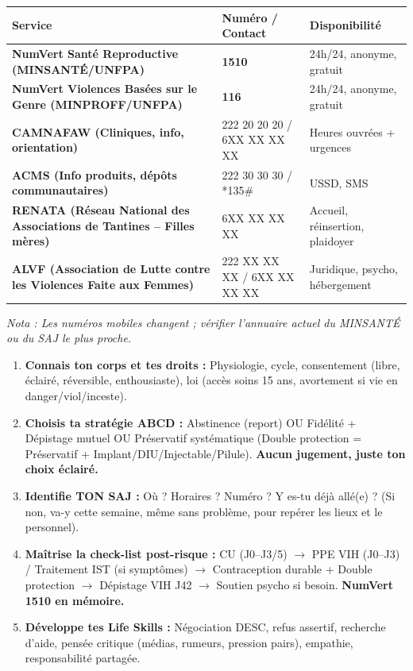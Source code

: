 \documentclass[11pt]{article}
\begin{document}
\begin{savaistu}
\begin{center}
\begin{tabularx}{\linewidth}{|l|X|l|}\hline
\textbf{Service} & \textbf{Numéro / Contact} & \textbf{Disponibilité} \\ \hline
\textbf{NumVert Santé Reproductive (MINSANTÉ/UNFPA)} & \textbf{1510} & 24h/24, anonyme, gratuit \\ \hline
\textbf{NumVert Violences Basées sur le Genre (MINPROFF/UNFPA)} & \textbf{116} & 24h/24, anonyme, gratuit \\ \hline
\textbf{CAMNAFAW (Cliniques, info, orientation)} & 222 20 20 20 / 6XX XX XX XX & Heures ouvrées + urgences \\ \hline
\textbf{ACMS (Info produits, dépôts communautaires)} & 222 30 30 30 / *135\# & USSD, SMS \\ \hline
\textbf{RENATA (Réseau National des Associations de Tantines -- Filles mères)} & 6XX XX XX XX & Accueil, réinsertion, plaidoyer \\ \hline
\textbf{ALVF (Association de Lutte contre les Violences Faite aux Femmes)} & 222 XX XX XX / 6XX XX XX XX & Juridique, psycho, hébergement \\ \hline
\end{tabularx}
\end{center}
\emph{Nota : Les numéros mobiles changent ; vérifier l'annuaire actuel du MINSANTÉ ou du SAJ le plus proche.}
\end{savaistu}

\begin{aretenir}
\begin{enumerate}
    \item \textbf{Connais ton corps et tes droits :} Physiologie, cycle, consentement (libre, éclairé, réversible, enthousiaste), loi (accès soins 15 ans, avortement si vie en danger/viol/inceste).
    \item \textbf{Choisis ta stratégie ABCD :} Abstinence (report) OU Fidélité + Dépistage mutuel OU Préservatif systématique (Double protection = Préservatif + Implant/DIU/Injectable/Pilule). \textbf{Aucun jugement, juste ton choix éclairé.}
    \item \textbf{Identifie TON SAJ :} Où ? Horaires ? Numéro ? Y es-tu déjà allé(e) ? (Si non, va-y cette semaine, même sans problème, pour repérer les lieux et le personnel).
    \item \textbf{Maîtrise la check-list post-risque :} CU (J0--J3/5) $\rightarrow$ PPE VIH (J0--J3) / Traitement IST (si symptômes) $\rightarrow$ Contraception durable + Double protection $\rightarrow$ Dépistage VIH J42 $\rightarrow$ Soutien psycho si besoin. \textbf{NumVert 1510 en mémoire.}
    \item \textbf{Développe tes Life Skills :} Négociation DESC, refus assertif, recherche d'aide, pensée critique (médias, rumeurs, pression pairs), empathie, responsabilité partagée.
\end{enumerate}
\end{aretenir}
\end{document}
